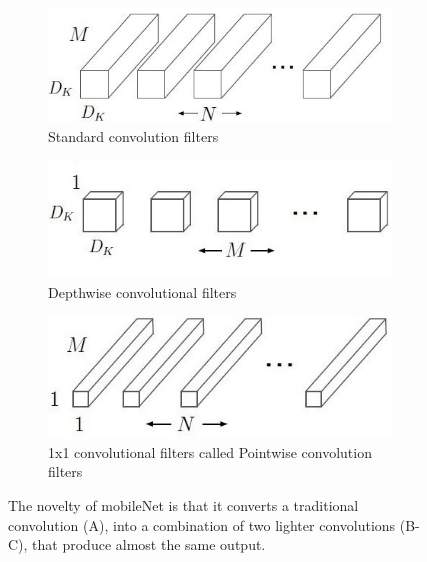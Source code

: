 \begin{figure}[!h]
	\centering
	\begin{subfigure}[t]{0.3\textwidth}
		\includegraphics[width=\linewidth]{images/detection/architecture_mobileNet1}
		\caption{Standard convolution filters}
		\label{fig:sub_architecture_mobileNet1}
	\end{subfigure}
	\hspace{0.02\linewidth}
	\begin{subfigure}[t]{0.3\textwidth}
		\includegraphics[width=\linewidth]{images/detection/architecture_mobileNet2}
		\caption{Depthwise convolutional filters}
		\label{fig:sub_architecture_mobileNet2}
	\end{subfigure}
	\hspace{0.02\linewidth}
	\begin{subfigure}[t]{0.3\textwidth}
		\includegraphics[width=\linewidth]{images/detection/architecture_mobileNet3}
		\caption{1x1 convolutional filters called Pointwise convolution filters}
		\label{fig:sub_architecture_mobileNet3}
	\end{subfigure}
	\captionsetup{margin=0.5cm}
	\caption[The schemes of convolutions introduced by mobileNet.]{The novelty of mobileNet is that it converts a traditional convolution (A), into a combination of two lighter convolutions (B-C), that produce almost the same output.}
	\label{fig:architecture_mobileNet}
\end{figure}


